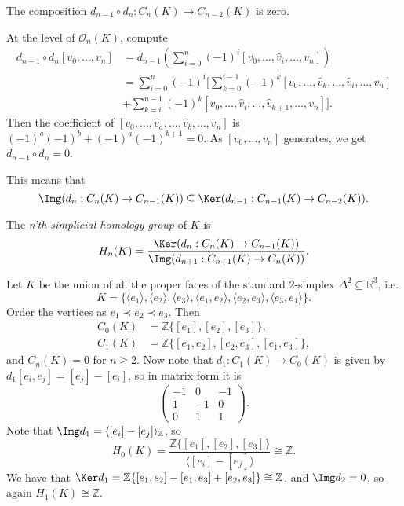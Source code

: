 \documentclass[12pt]{article}
\begin{document}
\begin{lemma}
	The composition $d_{n-1} \circ d_n : C_n (K) \to C_{n-2}(K)$ is zero.
\end{lemma}

\begin{proofbox}
	At the level of $\mathcal{O}_n(K)$, compute
	\begin{align*}
		d_{n-1} \circ d_n [v_0, \ldots, v_n] &= d_{n-1} \left( \sum_{i = 0}^n (-1)^i [v_0, \ldots, \hat v_i, \ldots, v_n ] \right) \\
						     &= \sum_{i = 0}^n (-1)^i \Biggl[ \sum_{k = 0}^{i-1}(-1)^k [v_0, \ldots, \hat v_k, \ldots, \hat v_i, \ldots, v_n] \\
						     &+ \sum_{k = i}^{n-1} (-1)^k [v_0, \ldots, \hat v_i, \ldots, \hat v_{k+1}, \ldots, v_n] \Biggr].
	\end{align*}
	Then the coefficient of $[v_0, \ldots, \hat v_a, \ldots, \hat v_b, \ldots, v_n]$ is $(-1)^a (-1)^b + (-1)^a (-1)^{b+1} = 0$. As $[v_0, \ldots, v_n]$ generates, we get $d_{n-1} \circ d_n =0$.
\end{proofbox}


This means that
\[
\Img (d_n : C_n(K) \to C_{n-1}(K)) \subseteq \Ker (d_{n-1} : C_{n-1}(K) \to C_{n-2}(K)).
\]

\begin{definition}
	The \emph{n'th simplicial homology group} of $K$  is
	\[
	H_n(K) = \frac{\Ker(d_n : C_n(K) \to C_{n-1}(K))}{\Img(d_{n+1} : C_{n+1}(K) \to C_n(K))}.
	\]
\end{definition}

\begin{exbox}
	Let $K$ be the union of all the proper faces of the standard $2$-simplex $\Delta^2 \subseteq \mathbb{R}^3$, i.e.
	\[
		K = \{\langle e_1 \rangle , \langle e_2 \rangle , \langle e_3 \rangle, \langle e_1, e_2 \rangle, \langle e_2, e_3\rangle, \langle e_3, e_1\rangle\}.
	\]
	Order the vertices as $e_1 \prec e_2 \prec e_3$. Then
	\begin{align*}
		C_0(K) &= \mathbb{Z}\{[e_1], [e_2], [e_3]\}, \\
		C_1(K) &= \mathbb{Z}\{[e_1, e_2], [e_2, e_3], [e_1, e_3]\},
	\end{align*}
	and $C_n(K) = 0$ for $n \geq 2$. Now note that $d_1 : C_1(K) \to C_0(K)$ is given by $d_1[e_i, e_j] = [e_j] - [e_i]$, so in matrix form it is
	\[
	\begin{pmatrix}
		-1 & 0 & -1 \\
		1 & -1 & 0 \\
		0 & 1 & 1
	\end{pmatrix}.
	\]
	Note that $\Img d_1 = \langle [e_i] - [e_j] \rangle_{\mathbb{Z}}$, so
	\[
		H_0(K) = \frac{\mathbb{Z}\{[e_1], [e_2], [e_3]\}}{\langle[e_i] - [e_j]\rangle} \cong \mathbb{Z}.
	\]
	We have that $\Ker d_1 = \mathbb{Z}\{[e_1, e_2] - [e_1, e_3] + [e_2, e_3]\} \cong \mathbb{Z}$, and $\Img d_2 = 0$, so again $H_1(K) \cong \mathbb{Z}$.
\end{exbox}
\end{document}
